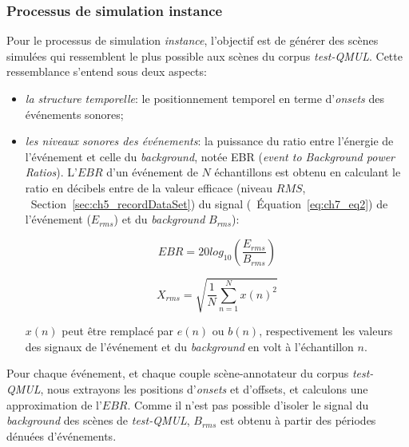
\subsubsection{Processus de simulation instance}
\label{sec:ch7_simuProcessInstance}

Pour le processus de simulation \emph{instance}, l'objectif est de générer des scènes simulées qui ressemblent le plus possible aux scènes du corpus \emph{test-QMUL}. Cette ressemblance s'entend sous deux aspects:

\begin{itemize}
\item \emph{la structure temporelle}: le positionnement temporel en terme d'\emph{onsets} des événements sonores;
\item \emph{les niveaux sonores des événements}: la puissance du ratio entre l'énergie de l'événement et celle du \emph{background}, notée EBR (\emph{event to Background power Ratios}). L'$EBR$ d'un événement de $N$ échantillons est obtenu en calculant le ratio en décibels entre de la valeur efficace (niveau $RMS$, \cf~Section~\ref{sec:ch5_recordDataSet}) du signal (\cf~Équation~\ref{eq:ch7_eq2}) de l'événement ($E_{rms}$) et du \emph{background}  $B_{rms}$):

\begin{equation}
\label{eq:ch7_eq1}
EBR=20log_{10} \left(  \dfrac{E_{rms}}{B_{rms}} \right) 
\end{equation}

\begin{equation}
\label{eq:ch7_eq2}
X_{rms}=\sqrt{\dfrac{1}{N} \sum_{n=1}^{N} x(n)^2}
\end{equation}

$x(n)$ peut être remplacé par $e(n)$ ou $b(n)$, respectivement les valeurs des signaux de l'événement et du \emph{background} en volt à l'échantillon $n$. 
\end{itemize}

Pour chaque événement, et chaque couple scène-annotateur du corpus \emph{test-QMUL}, nous extrayons les positions d'\emph{onsets} et d'{offsets}, et calculons une approximation de l'$EBR$. Comme il n'est pas possible d'isoler le signal du \emph{background} des scènes de \emph{test-QMUL}, $B_{rms}$ est obtenu à partir des périodes dénuées d'événements. \\
 
 \\

